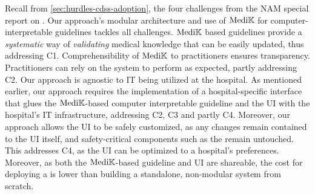 Recall from \autoref{sec:hurdles-cdss-adoption}, the four challenges from
the NAM{} special report on \CDSSs{}. Our approach's modular architecture and
use of $\text{Medi}\mathbb{K}{}{}$ for computer-interpretable guidelines tackles all
challenges. $\text{Medi}\mathbb{K}{}{}$ based guidelines provide a \emph{systematic} way of
\emph{validating} medical knowledge that can be easily updated, thus addressing
C1. Comprehensibility of $\text{Medi}\mathbb{K}{}{}$ to practitioners ensures transparency.
Practitioners can rely on the system to perform as expected, partly addressing C2.
Our approach is agnostic to IT being utilized at the
hospital. As mentioned earlier, our approach requires the implementation
of a hospital-specific interface that glues the $\text{Medi}\mathbb{K}{}{}$-based
computer interpretable guideline and the UI with the hospital's IT
infrastructure, addressing C2, C3 and partly C4. Moreover,
our approach allows the UI to be safely customized,
as any changes remain contained to the UI itself, and safety-critical
components such as the \BPGLogic{} remain untouched. This addresses C4,
as the UI can be optimized to a hospital's preferences. Moreover,
as both the $\text{Medi}\mathbb{K}{}{}$-based guideline and UI are shareable, the cost
for deploying a \CDSS{} is lower than building a standalone,
non-modular system from scratch.



